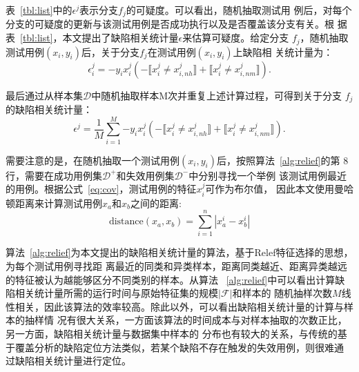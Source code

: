 表~\ref{tbl:list}中的$\epsilon^j$表示分支$f_j$的可疑度。可以看出，随机抽取测试用
例后，对每个分支的可疑度的更新与该测试用例是否成功执行以及是否覆盖该分支有关。根
据表~\ref{tbl:list}，本文提出了缺陷相关统计量$\epsilon$来估算可疑度。给定分支
$f_j$，随机抽取测试用例$(x_i,y_i)$后，关于分支$f_j$在测试用例$(x_i,y_i)$上缺陷相
关统计量为：
\begin{equation}
       \epsilon_i^j = -y_ix_i^j(-\llbracket x_i^j \neq x_{i,nh}^j \rrbracket + \llbracket x_i^j \neq x_{i,nm}^j \rrbracket). \label{eq:epsilon}
\end{equation}

最后通过从样本集$\mathcal D$中随机抽取样本M次并重复上述计算过程，可得到关于分支
$f_j$的缺陷相关统计量：
\begin{equation}
       \epsilon^j = \frac{1}{M}\sum_{i=1}^M{ -y_ix_i^j(-\llbracket x_i^j \neq x_{i,nh}^j \rrbracket + \llbracket x_i^j \neq x_{i,nm}^j \rrbracket)}. \label{eq:epsilon2}
\end{equation}

需要注意的是，在随机抽取一个测试用例$(x_i,y_i)$后，按照算法~\ref{alg:relief}的第
8行，需要在成功用例集$\mathcal D^+$和失效用例集$\mathcal D^-$中分别寻找一个举例
该测试用例最近的用例。根据公式~\eqref{eq:cov}，测试用例的特征$x_i^j$可作为布尔值，
因此本文使用曼哈顿距离来计算测试用例$x_a$和$x_b$之间的距离:
\begin{equation}
      \text{distance}(x_a,x_b) = \sum_{i=1}^n{|x_a^i-x_b^i|}
\end{equation}

算法~\ref{alg:relief}为本文提出的缺陷相关统计量的算法，基于Relef特征选择的思想，为每个测试用例寻找距
离最近的同类和异类样本，距离同类越近、距离异类越远的特征被认为越能够区分不同类别的样本。从算法
~\ref{alg:relief}中可以看出计算缺陷相关统计量所需的运行时间与原始特征集的规模$|\mathcal F|$和样本的
随机抽样次数$M$线性相关，因此该算法的效率较高。除此以外，可以看出缺陷相关统计量的计算与样本的抽样情
况有很大关系，一方面该算法的时间成本与对样本抽取的次数正比，另一方面，缺陷相关统计量与数据集中样本的
分布也有较大的关系，与传统的基于覆盖分析的缺陷定位方法类似，若某个缺陷不存在触发的失效用例，则很难通
过缺陷相关统计量进行定位。

